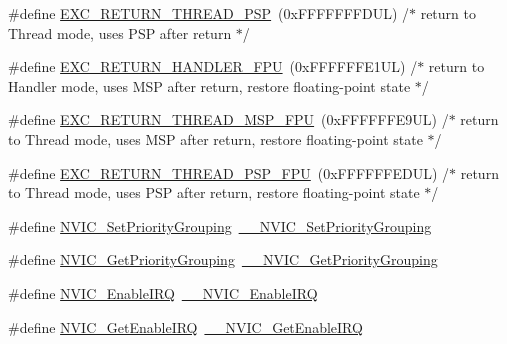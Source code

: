 \begin{DoxyCompactItemize}
\item 
\#define \hyperlink{group___c_m_s_i_s___core___n_v_i_c_functions_ga9998daf0fbdf31dbc8f81cd604b58175}{E\+X\+C\+\_\+\+R\+E\+T\+U\+R\+N\+\_\+\+T\+H\+R\+E\+A\+D\+\_\+\+P\+SP}~(0x\+F\+F\+F\+F\+F\+F\+F\+D\+U\+L)     /$\ast$ return to Thread mode, uses P\+S\+P after return                                $\ast$/
\item 
\#define \hyperlink{group___c_m_s_i_s___core___n_v_i_c_functions_ga3aa6648e1c3c09fbab1f543b9dcffc3a}{E\+X\+C\+\_\+\+R\+E\+T\+U\+R\+N\+\_\+\+H\+A\+N\+D\+L\+E\+R\+\_\+\+F\+PU}~(0x\+F\+F\+F\+F\+F\+F\+E1\+U\+L)     /$\ast$ return to Handler mode, uses M\+S\+P after return, restore floating-\/point state $\ast$/
\item 
\#define \hyperlink{group___c_m_s_i_s___core___n_v_i_c_functions_gaad4cb3b34fd4264ccfae1fbbc75a3431}{E\+X\+C\+\_\+\+R\+E\+T\+U\+R\+N\+\_\+\+T\+H\+R\+E\+A\+D\+\_\+\+M\+S\+P\+\_\+\+F\+PU}~(0x\+F\+F\+F\+F\+F\+F\+E9\+U\+L)     /$\ast$ return to Thread mode, uses M\+S\+P after return, restore floating-\/point state  $\ast$/
\item 
\#define \hyperlink{group___c_m_s_i_s___core___n_v_i_c_functions_gadd2299e1d3a79c90b610c6b6f4cadb95}{E\+X\+C\+\_\+\+R\+E\+T\+U\+R\+N\+\_\+\+T\+H\+R\+E\+A\+D\+\_\+\+P\+S\+P\+\_\+\+F\+PU}~(0x\+F\+F\+F\+F\+F\+F\+E\+D\+U\+L)     /$\ast$ return to Thread mode, uses P\+S\+P after return, restore floating-\/point state  $\ast$/
\item 
\#define \hyperlink{group___c_m_s_i_s___core___n_v_i_c_functions_ga0e798d5aec68cdd8263db86a76df788f}{N\+V\+I\+C\+\_\+\+Set\+Priority\+Grouping}~\hyperlink{group___c_m_s_i_s___core___n_v_i_c_functions_gafc94dcbaee03e4746ade1f5bb9aaa56d}{\+\_\+\+\_\+\+N\+V\+I\+C\+\_\+\+Set\+Priority\+Grouping}
\item 
\#define \hyperlink{group___c_m_s_i_s___core___n_v_i_c_functions_ga4eeb9214f2264fc23c34ad5de2d3fa11}{N\+V\+I\+C\+\_\+\+Get\+Priority\+Grouping}~\hyperlink{group___c_m_s_i_s___core___n_v_i_c_functions_ga9b894af672df4373eb637f8288845c05}{\+\_\+\+\_\+\+N\+V\+I\+C\+\_\+\+Get\+Priority\+Grouping}
\item 
\#define \hyperlink{group___c_m_s_i_s___core___n_v_i_c_functions_ga57b3064413dbc7459d9646020fdd8bef}{N\+V\+I\+C\+\_\+\+Enable\+I\+RQ}~\hyperlink{group___c_m_s_i_s___core___n_v_i_c_functions_ga71227e1376cde11eda03fcb62f1b33ea}{\+\_\+\+\_\+\+N\+V\+I\+C\+\_\+\+Enable\+I\+RQ}
\item 
\#define \hyperlink{group___c_m_s_i_s___core___n_v_i_c_functions_ga857de13232ec65dd15087eaa15bc4a69}{N\+V\+I\+C\+\_\+\+Get\+Enable\+I\+RQ}~\hyperlink{group___c_m_s_i_s___core___n_v_i_c_functions_gaaeb5e7cc0eaad4e2817272e7bf742083}{\+\_\+\+\_\+\+N\+V\+I\+C\+\_\+\+Get\+Enable\+I\+RQ}

\end{DoxyCompactItemize}
